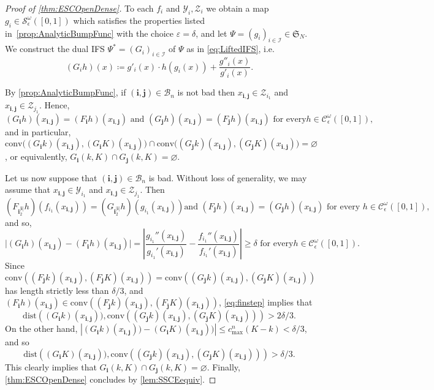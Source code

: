 \documentclass[11pt,]{article}
\def\cref#1{\ref{#1}}%
\theoremstyle{definition}
\theoremstyle{remark}
\newcommand{\0}{\mathbf{0}}
\newcommand{\bi}{\mathbf{i}}
\newcommand{\bj}{\mathbf{j}}
\numberwithin{equation}{section}
\begin{document}
\begin{proof}[Proof of \cref{thm:ESCOpenDense}]
To each $f_i$ and $\mathcal{Y}_i, \mathcal{Z}_i$ we obtain a map
$g_i\in\mathcal{S}_\epsilon^\omega([0,1])$ which satisfies the properties
listed in~\cref{prop:AnalyticBumpFunc} with the choice $\varepsilon=\delta$, and let
$\Psi=(g_i)_{i\in\mathcal{I}}\in\mathfrak{S}_N$. We construct the dual IFS
$\Psi^*=(G_i)_{i\in\mathcal{I}}$ of $\Psi$ as in \cref{eq:LiftedIFS}, i.e. 
\begin{equation*}
(G_ih)(x)\coloneqq g'_i(x)\cdot h(g_i(x)) + \frac{g''_i(x)}{g'_i(x)}.
\end{equation*}

By \cref{prop:AnalyticBumpFunc}, if $(\bi,\bj)\in\mathcal{B}_n$ is not bad then
$x_{\bi,\bj}\in\mathcal{Z}_{i_1}$ and $x_{\bi,\bj}\in\mathcal{Z}_{j_1}$. Hence,
\begin{equation*}
(G_{\bi}h)(x_{\bi,\bj})=(F_{\bi}h)(x_{\bi,\bj}) \text{ and }
(G_{\bj}h)(x_{\bi,\bj})=(F_{\bj}h)(x_{\bi,\bj})\text{ for every
}h\in\mathcal{C}_\epsilon^\omega([0,1]),
\end{equation*}
and in particular, $\mathrm{conv}\big((G_{\bi}k)(x_{\bi,\bj}), (G_{\bi}K)(x_{\bi,\bj})\big) \cap
\mathrm{conv}\big((G_{\bj}k)(x_{\bi,\bj}),
(G_{\bj}K)(x_{\bi,\bj})\big)=\varnothing$, or equivalently, $G_{\bi}(k,K)\cap G_{\bj}(k,K)=\varnothing$.

Let us now suppose that $(\bi,\bj)\in\mathcal{B}_n$ is bad. Without loss of generality, we may
assume that $x_{\bi,\bj}\in\mathcal{Y}_{i_1}$ and $x_{\bi,\bj}\in\mathcal{Z}_{j_1}$. Then
\begin{equation*}
	(F_{\bi_2^{|\bi|}}h)(f_{i_1}(x_{\bi,\bj}))=(G_{\bi_2^{|\bi|}}h)(g_{i_1}(x_{\bi,\bj})) \text{
	and } (F_{\bj}h)(x_{\bi,\bj})=(G_{\bj}h)(x_{\bi,\bj})\text{ for every
	}h\in\mathcal{C}_\epsilon^\omega([0,1]),
\end{equation*}
and so,
\begin{equation}\label{eq:finstep}
\big|(G_{\bi}h)(x_{\bi,\bj})-(F_{\bi}h)(x_{\bi,\bj})\big| = \left|
\frac{g_{i_1}''(x_{\bi,\bj})}{g_{i_1}'(x_{\bi,\bj})} -
\frac{f_{i_1}''(x_{\bi,\bj})}{f_{i_1}'(x_{\bi,\bj})} \right|\geq \delta\text{ for every
}h\in\mathcal{C}_\epsilon^\omega([0,1]).
\end{equation}
Since
$\mathrm{conv}\left((F_{\bj}k)(x_{\bi,\bj}),(F_{\bj}K)(x_{\bi,\bj})\right)=\mathrm{conv}\left((G_{\bj}k)(x_{\bi,\bj}),(G_{\bj}K)(x_{\bi,\bj})\right)$
has length strictly less than $\delta/3$, and
$(F_{\bi}h)(x_{\bi,\bj})\in\mathrm{conv}\left((F_{\bj}k)(x_{\bi,\bj}),(F_{\bj}K)(x_{\bi,\bj})\right)$,
\cref{eq:finstep} implies that 
$$
\mathrm{dist}\left((G_{\bi}k)(x_{\bi,\bj})),\mathrm{conv}\left((G_{\bj}k)(x_{\bi,\bj}),(G_{\bj}K)(x_{\bi,\bj})\right)\right)>2\delta/3. 
$$
On the other hand, $|(G_{\bi}k)(x_{\bi,\bj}))-(G_{\bi}K)(x_{\bi,\bj}))|\leq c_{\max}^n(K-k)<\delta/3$, and so 
$$
\mathrm{dist}\left((G_{\bi}K)(x_{\bi,\bj})),\mathrm{conv}\left((G_{\bj}k)(x_{\bi,\bj}),(G_{\bj}K)(x_{\bi,\bj})\right)\right)>\delta/3. 
$$
This clearly implies that  $G_{\bi}(k,K)\cap G_{\bj}(k,K)=\varnothing$. Finally, \cref{thm:ESCOpenDense} concludes by \cref{lem:SSCEequiv}.   
\end{proof}
\end{document}
